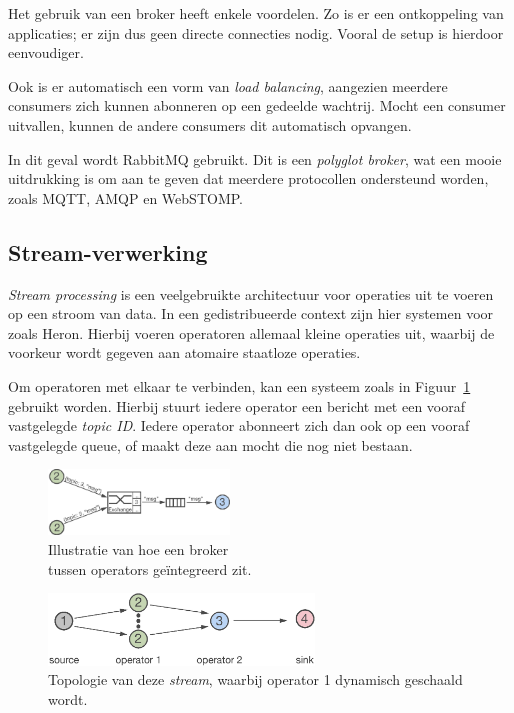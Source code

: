 \documentclass[twocolumn, a4paper]{article}
\begin{document}
Het gebruik van een broker heeft enkele voordelen. Zo is er een ontkoppeling van applicaties; er zijn dus geen directe connecties nodig. Vooral de setup is hierdoor eenvoudiger. 

Ook is er automatisch een vorm van \emph{load balancing}, aangezien meerdere consumers zich kunnen abonneren op een gedeelde wachtrij. Mocht een consumer uitvallen, kunnen de andere consumers dit automatisch opvangen. 

In dit geval wordt RabbitMQ gebruikt. Dit is een \emph{polyglot broker}, wat een mooie uitdrukking is om aan te geven dat meerdere protocollen ondersteund worden, zoals MQTT, AMQP en WebSTOMP.

\subsection{Stream-verwerking}\label{ss:stream}
\emph{Stream processing} is een veelgebruikte architectuur voor operaties uit te voeren op een stroom van data. In een gedistribueerde context zijn hier systemen voor zoals Heron. Hierbij voeren operatoren allemaal kleine operaties uit, waarbij de voorkeur wordt gegeven aan atomaire staatloze operaties.

Om operatoren met elkaar te verbinden, kan een systeem zoals in Figuur~\ref{fig:operator-queue} gebruikt worden. Hierbij stuurt iedere operator een bericht met een vooraf vastgelegde \emph{topic ID}. Iedere operator abonneert zich dan ook op een vooraf vastgelegde queue, of maakt deze aan mocht die nog niet bestaan. 

\begin{figure}[htb]
    \centering
    \includegraphics[width=0.43\textwidth]{operator_queue}
    \caption{Illustratie van hoe een broker\\tussen operators geïntegreerd zit.}\label{fig:operator-queue}
\end{figure}

\begin{figure}[htb]
    \centering
    \includegraphics[width=0.63\textwidth]{flow}
    \caption{Topologie van deze \emph{stream}, waarbij operator 1 dynamisch geschaald wordt.}\label{fig:flow}
\end{figure}
\end{document}
